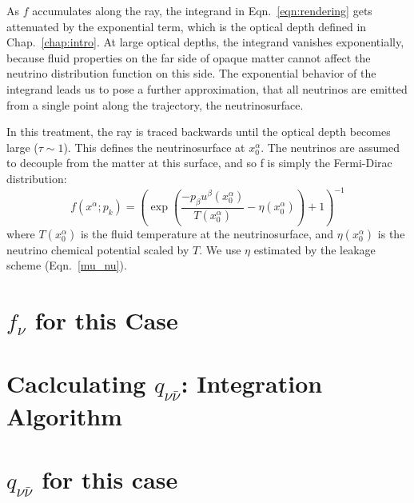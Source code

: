 As $f$ accumulates along the ray, the integrand in Eqn.~\ref{eqn:rendering}
gets attenuated by the exponential term, which is the optical depth defined in
Chap.~\ref{chap:intro}.
At large optical depths, the integrand vanishes exponentially, because fluid
properties on the far side of opaque matter cannot affect the neutrino
distribution function on this side. The exponential behavior of the integrand
leads us to pose a further approximation, that all neutrinos are emitted from
a single point along the trajectory, the neutrinosurface.

In this treatment, the ray is traced backwards until the optical depth becomes
large ($\tau\sim1$). This defines the neutrinosurface at $x_0^\alpha$. The
neutrinos are assumed to decouple from the matter at this surface, and so f
is simply the Fermi-Dirac distribution:
\begin{equation}
  \label{eqn:f_fermi_dirac}
  f(x^\alpha;p_k) =
  \left(\exp\left(\frac{-p_\beta u^\beta(x_0^\alpha)}{T(x_0^\alpha)}-\eta(x_0^\alpha) \right)+1\right)^{-1}
\end{equation}
where $T(x_0^\alpha)$ is the fluid temperature at the neutrinosurface, and
$\eta(x_0^\alpha)$ is the neutrino chemical potential scaled by $T$.
We use $\eta$ estimated by the leakage scheme (Eqn.~\ref{mu_nu}).

\section{$f_\nu$ for this Case}
\label{sec:f_this_case}

\section{Caclculating $q_{\nu \bar{\nu}}$: Integration Algorithm}
\label{sec:q_algorithm}

\section{$q_{\nu \bar{\nu}}$ for this case}
\label{sec:q_this_case}
